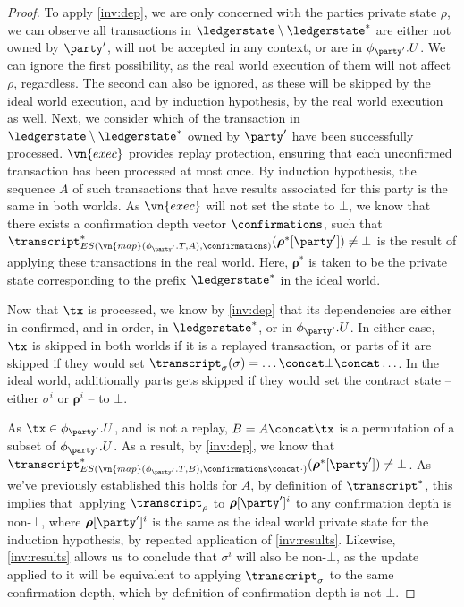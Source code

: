 \begin{proof}
  To apply \ref{inv:dep}, we are only concerned with the parties private
  state $\rho$, we can observe all transactions in $\ledgerstate \setminus
  \ledgerstate^*$ are either not owned by $\party'$, will not be accepted in any
  context, or are in $\phi_{\party'}.U$. We can ignore the first possibility, as
  the real world execution of them will not affect $\rho$, regardless. The
  second can also be ignored, as these will be skipped by the ideal world
  execution, and by induction hypothesis, by the real world execution as well.
  Next, we consider which of the transaction in $\ledgerstate \setminus
  \ledgerstate^*$ owned by $\party'$ have been successfully processed.
  $\vn{exec}$ provides replay protection, ensuring that each unconfirmed
  transaction has been processed at most once. By induction hypothesis, the
  sequence $A$ of such transactions that have results associated for this
  party is the same in both worlds.
  As $\vn{exec}$ will not set the state to $\bot$, we know that there
    exists a confirmation depth vector $\confirmations$, such that
  $\transcript^*_{ES(\vn{map}(\phi_{\party'}.T, A), \confirmations)}(\boldsymbol\rho^*[\party'])
  \neq \bot$ is the result of applying these transactions in the real world. Here,
  $\boldsymbol\rho^*$ is taken to be the private state
  corresponding to the prefix $\ledgerstate^*$ in the ideal world.

  Now that $\tx$ is processed, we know by \ref{inv:dep} that its dependencies
  are either in confirmed, and in order, in $\ledgerstate^*$, or in
  $\phi_{\party'}.U$. In either case, $\tx$ is skipped in both worlds if it is a
  replayed transaction, or parts of it are skipped if they would set $\transcript_\sigma(\sigma) = \ldots \concat \bot \concat \ldots$. In
  the ideal world, additionally parts gets skipped if they would set the contract
  state -- either $\sigma^i$ or $\boldsymbol\rho^i$ -- to $\bot$.

  As $\tx \in \phi_{\party'}.U$, and is not a replay, $B = A \concat \tx$ is a
  permutation of a subset of $\phi_{\party'}.U$. As a result, by \ref{inv:dep},
  we know that $\transcript^*_{ES(\vn{map}(\phi_{\party'}.T,
    B), \confirmations \concat \cdot)}(\boldsymbol\rho^*[\party']) \neq \bot$. As we've previously established
  this holds for $A$, by definition of $\transcript^*$, this implies that\ 
  applying $\transcript_\rho$ to $\boldsymbol\rho[\party']^i$ to any
    confirmation depth is non-$\bot$, where
  $\boldsymbol\rho[\party']^{i}$ is the same as the ideal world private state for
  the induction hypothesis, by repeated application of \ref{inv:results}.
  Likewise, \ref{inv:results} allows us to conclude that $\sigma^i$ will also be
  non-$\bot$, as the update applied to it will be equivalent to applying
    $\transcript_\sigma$ to the same confirmation depth, which by definition of
    confirmation depth is not $\bot$.
  

\end{proof}
